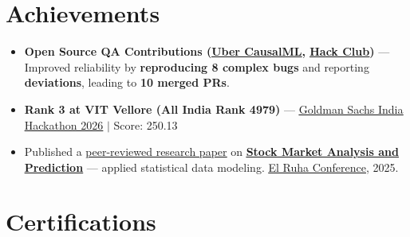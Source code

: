 \documentclass[a4paper,10pt]{article}
\newcommand{\ulink}[2]{\href{#1}{\uline{#2}}}
\begin{document}
\vspace{2pt}

\section{Achievements}
\vspace{2pt}
\begin{itemize}[nosep, leftmargin=1.5em, itemsep=1pt, topsep=2pt]
  \item {\color[HTML]{0A0A0A}\fontsize{11}{14}\selectfont \textbf{Open Source QA Contributions (\ulink{https://github.com/uber/causalml}{Uber CausalML}, \ulink{https://github.com/hackclub/stardance}{Hack Club})} --- Improved reliability by \textbf{reproducing 8 complex bugs} and reporting \textbf{deviations}, leading to \textbf{10 merged PRs}.}
  \item {\color[HTML]{0A0A0A}\fontsize{11}{14}\selectfont \textbf{Rank 3 at VIT Vellore (All India Rank 4979)} --- \ulink{https://www.hackerrank.com/contests/goldman-sachs-india-hackathon-2026-cs/leaderboard}{Goldman Sachs India Hackathon 2026} $|$ Score: 250.13}
  \item {\color[HTML]{0A0A0A}\fontsize{11}{14}\selectfont
  Published a \ulink{https://www.elruha.org/_files/ugd/614b1f_6b95e1b697bf452b9907ba46e0151c05.pdf\#page=774}{peer-reviewed research paper} on \ulink{https://github.com/su-jin1425/Set-Project}{\textbf{Stock Market Analysis and Prediction}} --- applied statistical data modeling. \ulink{https://www.elruha.org/congress-books}{El Ruha Conference}, 2025.}
\end{itemize}

\vspace{2pt}

\section{Certifications}
\vspace{2pt}
\end{document}
